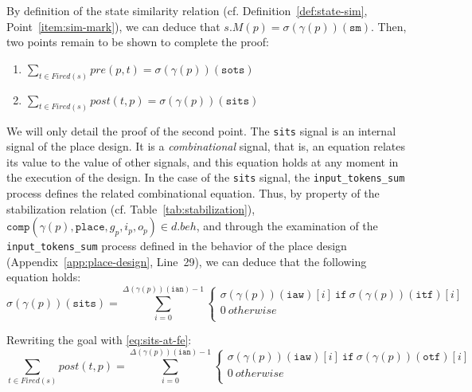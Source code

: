 \begin{pf}
  \bigskip
  
  By definition of the state similarity relation
  (cf. Definition~\ref{def:state-sim}, Point~\ref{item:sim-mark}), we
  can deduce that $s.M(p)=\sigma(\gamma(p))(\texttt{sm})$. Then, two
  points remain to be shown to complete the proof:
  \begin{enumerate}
  \item $\sum\limits_{t\in{}Fired(s)}pre(p,t)=\sigma(\gamma(p))(\texttt{sots})$
  \item $\sum\limits_{t\in{}Fired(s)}post(t,p)=\sigma(\gamma(p))(\texttt{sits})$
  \end{enumerate}

  \bigskip
  
  We will only detail the proof of the second point. The \texttt{sits}
  signal is an internal signal of the place design. It is a
  \textit{combinational} signal, that is, an equation relates its
  value to the value of other signals, and this equation holds at any
  moment in the execution of the design.  In the case of the
  \texttt{sits} signal, the \texttt{input\_tokens\_sum} process
  defines the related combinational equation.  Thus, by property of
  the stabilization relation (cf. Table~\ref{tab:stabilization}),
  $\mathtt{comp}(\gamma(p),\mathtt{place},g_p,i_p,o_p)\in{}d.beh$, and
  through the examination of the \texttt{input\_tokens\_sum} process
  defined in the behavior of the place design
  (Appendix~\ref{app:place-design}, Line~29), we can deduce that the
  following equation holds:
  \begin{equation}
    \label{eq:sits-at-fe}
    \sigma(\gamma(p))(\texttt{sits})=\sum\limits_{i=0}^{\Delta(\gamma(p))(\texttt{ian})-1}
    \begin{cases}
      \sigma(\gamma(p))(\texttt{iaw})[i]~\mathtt{if}~\sigma(\gamma(p))(\texttt{itf})[i]\\
      0~otherwise \\
    \end{cases}
  \end{equation}

  \noindent{}Rewriting the goal with \eqref{eq:sits-at-fe}:\\
  \begin{equation*}
    \boxed{
      \sum\limits_{t\in{}Fired(s)}post(t,p)=\sum\limits_{i=0}^{\Delta(\gamma(p))(\texttt{ian})-1}
      \begin{cases}
        \sigma(\gamma(p))(\texttt{iaw})[i]~\mathtt{if}~\sigma(\gamma(p))(\texttt{otf})[i]\\
        0~otherwise \\
      \end{cases}}
  \end{equation*}


\end{pf}
